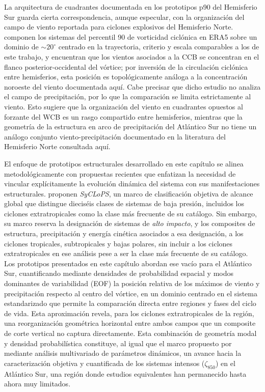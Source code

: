 La arquitectura de cuadrantes documentada en los prototipos p90 del Hemisferio Sur guarda cierta correspondencia, aunque especular, con la organización del campo de viento reportada para ciclones explosivos del Hemisferio Norte. \citet{priestley2022improved} componen los sistemas del percentil 90 de vorticidad ciclónica en ERA5 sobre un dominio de ${\sim}20^{\circ}$ centrado en la trayectoria, criterio y escala comparables a los de este trabajo, y encuentran que los vientos asociados a la CCB se concentran en el flanco posterior-occidental del vórtice; por inversión de la circulación ciclónica entre hemisferios, esta posición es topológicamente análoga a la concentración noroeste del viento documentada aquí. Cabe precisar que dicho estudio no analiza el campo de precipitación, por lo que la comparación se limita estrictamente al viento. Esto sugiere que la organización del viento en cuadrantes opuestos al forzante del WCB es un rasgo compartido entre hemisferios, mientras que la geometría de la estructura en arco de precipitación del Atlántico Sur no tiene un análogo conjunto viento-precipitación documentado en la literatura del Hemisferio Norte consultada aquí.


El enfoque de prototipos estructurales desarrollado en este capítulo se alinea metodológicamente con propuestas recientes que enfatizan la necesidad de vincular explícitamente la evolución dinámica del sistema con sus manifestaciones estructurales. \citet{han2025system} proponen \textit{SyCLoPS}, un marco de clasificación objetiva de alcance global que distingue dieciséis clases de sistemas de baja presión, incluidos los ciclones extratropicales como la clase más frecuente de su catálogo. Sin embargo, su marco reserva la designación de sistemas de \textit{alto impacto}, y los composites de estructura, precipitación y energía cinética asociados a esa designación, a los ciclones tropicales, subtropicales y bajas polares, sin incluir a los ciclones extratropicales en ese análisis pese a ser la clase más frecuente de su catálogo. Los prototipos presentados en este capítulo abordan ese vacío para el Atlántico Sur, cuantificando mediante densidades de probabilidad espacial y modos dominantes de variabilidad (EOF) la posición relativa de los máximos de viento y precipitación respecto al centro del vórtice, en un dominio centrado en el sistema estandarizado que permite la comparación directa entre regiones y fases del ciclo de vida. Esta aproximación revela, para los ciclones extratropicales de la región, una reorganización geométrica horizontal entre ambos campos que un composite de corte vertical no captura directamente. Esta combinación de geometría modal y densidad probabilística constituye, al igual que el marco propuesto por \citet{corner2025classification} mediante análisis multivariado de parámetros dinámicos, un avance hacia la caracterización objetiva y cuantificada de los sistemas intensos ($\zeta_{850}$) en el Atlántico Sur, una región donde estudios equivalentes han permanecido hasta ahora muy limitados.

